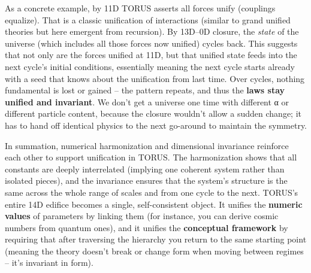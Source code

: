 \documentclass[]{article}
\begin{document}
As a concrete example, by 11D TORUS asserts all forces unify (couplings
equalize)​. That is a classic unification of interactions (similar to
grand unified theories but here emergent from recursion). By 13D--0D
closure, the \emph{state} of the universe (which includes all those
forces now unified) cycles back. This suggests that not only are the
forces unified at 11D, but that unified state feeds into the next
cycle's initial conditions, essentially meaning the next cycle starts
already with a seed that knows about the unification from last time.
Over cycles, nothing fundamental is lost or gained -- the pattern
repeats, and thus the \textbf{laws stay unified and invariant}. We don't
get a universe one time with different α or different particle content,
because the closure wouldn't allow a sudden change; it has to hand off
identical physics to the next go-around to maintain the symmetry.

In summation, numerical harmonization and dimensional invariance
reinforce each other to support unification in TORUS. The harmonization
shows that all constants are deeply interrelated (implying one coherent
system rather than isolated pieces), and the invariance ensures that the
system's structure is the same across the whole range of scales and from
one cycle to the next. TORUS's entire 14D edifice becomes a single,
self-consistent object. It unifies the \textbf{numeric values} of
parameters by linking them (for instance, you can derive cosmic numbers
from quantum ones), and it unifies the \textbf{conceptual framework} by
requiring that after traversing the hierarchy you return to the same
starting point (meaning the theory doesn't break or change form when
moving between regimes -- it's invariant in form).
\end{document}
